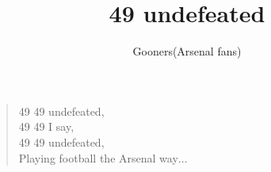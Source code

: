 \documentclass[a4paper,12pt]{article}
\title{49 undefeated}
\author{Gooners(Arsenal fans)}
\date{}
\begin{document}
	
	\maketitle
	
	\begin{verse}
		
		49 49 undefeated, \\
		49 49 I say, \\
		49 49 undefeated, \\ 
		Playing football the Arsenal way$\ldots$
		
	\end{verse}
	
\end{document}
